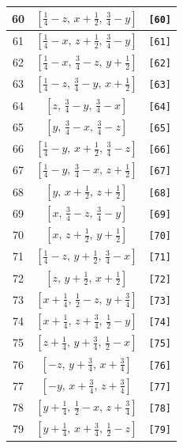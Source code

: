 \documentclass[fleqn,8pt]{jsarticle}
\begin{document}
\begin{longtable}{ccc}
60 & $\left[ \frac{1}{4} - z,\, x + \frac{1}{2},\, \frac{3}{4} - y \right]$ & {\tt [60]} \\ \hline
61 & $\left[ \frac{1}{4} - x,\, z + \frac{1}{2},\, \frac{3}{4} - y \right]$ & {\tt [61]} \\ \hline
62 & $\left[ \frac{1}{4} - x,\, \frac{3}{4} - z,\, y + \frac{1}{2} \right]$ & {\tt [62]} \\ \hline
63 & $\left[ \frac{1}{4} - z,\, \frac{3}{4} - y,\, x + \frac{1}{2} \right]$ & {\tt [63]} \\ \hline
64 & $\left[ z,\, \frac{3}{4} - y,\, \frac{3}{4} - x \right]$ & {\tt [64]} \\ \hline
65 & $\left[ y,\, \frac{3}{4} - x,\, \frac{3}{4} - z \right]$ & {\tt [65]} \\ \hline
66 & $\left[ \frac{1}{4} - y,\, x + \frac{1}{2},\, \frac{3}{4} - z \right]$ & {\tt [66]} \\ \hline
67 & $\left[ \frac{1}{4} - y,\, \frac{3}{4} - x,\, z + \frac{1}{2} \right]$ & {\tt [67]} \\ \hline
68 & $\left[ y,\, x + \frac{1}{2},\, z + \frac{1}{2} \right]$ & {\tt [68]} \\ \hline
69 & $\left[ x,\, \frac{3}{4} - z,\, \frac{3}{4} - y \right]$ & {\tt [69]} \\ \hline
70 & $\left[ x,\, z + \frac{1}{2},\, y + \frac{1}{2} \right]$ & {\tt [70]} \\ \hline
71 & $\left[ \frac{1}{4} - z,\, y + \frac{1}{2},\, \frac{3}{4} - x \right]$ & {\tt [71]} \\ \hline
72 & $\left[ z,\, y + \frac{1}{2},\, x + \frac{1}{2} \right]$ & {\tt [72]} \\ \hline
73 & $\left[ x + \frac{1}{4},\, \frac{1}{2} - z,\, y + \frac{3}{4} \right]$ & {\tt [73]} \\ \hline
74 & $\left[ x + \frac{1}{4},\, z + \frac{3}{4},\, \frac{1}{2} - y \right]$ & {\tt [74]} \\ \hline
75 & $\left[ z + \frac{1}{4},\, y + \frac{3}{4},\, \frac{1}{2} - x \right]$ & {\tt [75]} \\ \hline
76 & $\left[ - z,\, y + \frac{3}{4},\, x + \frac{3}{4} \right]$ & {\tt [76]} \\ \hline
77 & $\left[ - y,\, x + \frac{3}{4},\, z + \frac{3}{4} \right]$ & {\tt [77]} \\ \hline
78 & $\left[ y + \frac{1}{4},\, \frac{1}{2} - x,\, z + \frac{3}{4} \right]$ & {\tt [78]} \\ \hline
79 & $\left[ y + \frac{1}{4},\, x + \frac{3}{4},\, \frac{1}{2} - z \right]$ & {\tt [79]} \\ \hline

\end{longtable}
\end{document}

